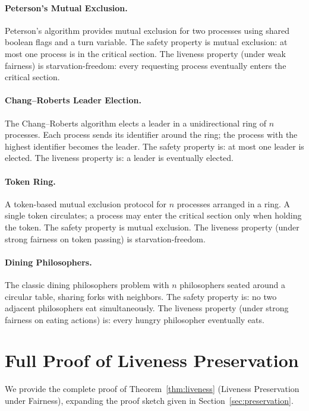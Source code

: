 \documentclass[11pt]{article}
\begin{document}
\paragraph{Peterson's Mutual Exclusion.}
Peterson's algorithm provides mutual exclusion for two processes using
shared boolean flags and a turn variable.
The safety property is mutual exclusion: at most one process is in the
critical section.
The liveness property (under weak fairness) is starvation-freedom: every
requesting process eventually enters the critical section.

\paragraph{Chang--Roberts Leader Election.}
The Chang--Roberts algorithm elects a leader in a unidirectional ring of
$n$ processes.
Each process sends its identifier around the ring; the process with the
highest identifier becomes the leader.
The safety property is: at most one leader is elected.
The liveness property is: a leader is eventually elected.

\paragraph{Token Ring.}
A token-based mutual exclusion protocol for $n$ processes arranged in a
ring.
A single token circulates; a process may enter the critical section only
when holding the token.
The safety property is mutual exclusion.
The liveness property (under strong fairness on token passing) is
starvation-freedom.

\paragraph{Dining Philosophers.}
The classic dining philosophers problem with $n$ philosophers seated
around a circular table, sharing forks with neighbors.
The safety property is: no two adjacent philosophers eat simultaneously.
The liveness property (under strong fairness on eating actions) is:
every hungry philosopher eventually eats.

\section{Full Proof of Liveness Preservation}
\label{app:liveness-proof}

We provide the complete proof of Theorem~\ref{thm:liveness} (Liveness
Preservation under Fairness), expanding the proof sketch given in
Section~\ref{sec:preservation}.
\end{document}
